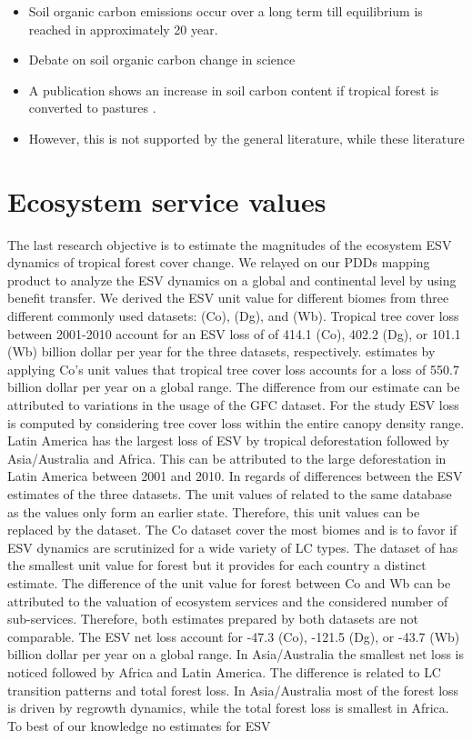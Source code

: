 \begin{itemize}
			\item Soil organic carbon emissions occur over a long term till equilibrium is reached in approximately 20 year.
			\item Debate on soil organic carbon change in science
			\item A publication shows an increase in soil carbon content if tropical forest is converted to pastures \citep{Schipper2017}.
			\item However, this is not supported by the general literature, while these literature 
	\end{itemize}

	\section{Ecosystem service values}
		The last research objective is to estimate the magnitudes of the ecosystem \ac{ESV} dynamics of tropical forest cover change. We relayed on our \acp{PDD} mapping product to analyze the \ac{ESV} dynamics on a global and continental level by using benefit transfer. We derived the \ac{ESV} unit value for different biomes from three different commonly used datasets: \citet{Costanza2014} (Co), \citet{Groot2012} (Dg), and \citet{Siikamaki2015} (Wb). Tropical tree cover loss between 2001-2010 account for an \ac{ESV} loss of of 414.1 (Co), 402.2 (Dg), or 101.1 (Wb) billion dollar per year for the three datasets, respectively. \citet{Song2018} estimates by applying Co's unit values that tropical tree cover loss accounts for a loss of 550.7 billion dollar per year on a global range. The difference from our estimate can be attributed to variations in the usage of the \ac{GFC} dataset. For the study \ac{ESV} loss is computed by considering tree cover loss within the entire canopy density range. Latin America has the largest loss of \ac{ESV} by tropical deforestation followed by Asia/Australia and Africa. This can be attributed to the large deforestation in Latin America between 2001 and 2010. In regards of differences between the \ac{ESV} estimates of the three datasets. The unit values of \citet{Groot2012} related to the same database as the \citet{Costanza2014} values only form an earlier state. Therefore, this unit values can be replaced by the \citet{Costanza2014} dataset. The Co dataset cover the most biomes and is to favor if \ac{ESV} dynamics are scrutinized for a wide variety of \ac{LC} types. The dataset of \citet{Siikamaki2015} has the smallest unit value for forest but it provides for each country a distinct estimate. The difference of the unit value for forest between Co and Wb can be attributed to the valuation of ecosystem services and the considered number of sub-services. Therefore, both estimates prepared by both datasets are not comparable. The \ac{ESV} net loss account for -47.3 (Co), -121.5 (Dg), or -43.7 (Wb) billion dollar per year on a global range. In Asia/Australia the smallest net loss is noticed followed by Africa and Latin America. The difference is related to \ac{LC} transition patterns and total forest loss. In Asia/Australia most of the forest loss is driven by regrowth dynamics, while the total forest loss is smallest in Africa. To best of our knowledge no estimates for \ac{ESV} 